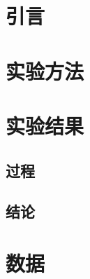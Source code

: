 \documentclass[12pt]{article} %
\begin{document}
	\section{引言}
	\section{实验方法}
	\section{实验结果}
	\subsection{过程}
	\subsection{结论}
	\section{数据}
	
	
	
	
	
	
\end{document}
